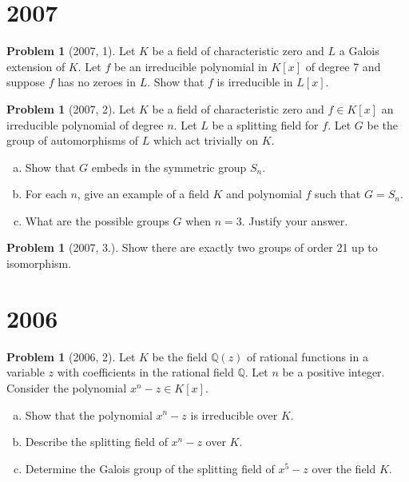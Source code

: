 \documentclass{article}
\newcommand{\<}{\langle} %
\renewcommand{\>}{\rangle} %
\theoremstyle{plain}
\theoremstyle{remark}
\theoremstyle{definition}
\newtheorem{examproblem}[equation]{Problem}
\begin{document}
\newpage

\section{2007}

\begin{examproblem}[2007, 1]
	Let $K$ be a field of characteristic zero and $L$ a Galois extension
	of $K$. Let $f$ be an irreducible polynomial in $K[x]$ of degree 7 and
	suppose $f$ has no zeroes in $L$. Show that $f$ is irreducible
	in $L[x]$.
\end{examproblem}

\begin{examproblem}[2007, 2]
	Let $K$ be a field of characteristic zero and $f\in K[x]$ an
	irreducible polynomial of degree $n$. Let $L$ be a splitting field for
	$f$. Let $G$ be the group of automorphisms of $L$ which act trivially
	on $K$.
	\begin{enumerate}[(a)]
		\item Show that $G$ embeds in the symmetric group $S_n$.
		\item For each $n$, give an example of a field $K$ and polynomial
			$f$ such that $G=S_n$.
		\item What are the possible groups $G$ when $n=3$. Justify
			your answer.
	\end{enumerate}
\end{examproblem}

\begin{examproblem}[2007, 3.]
	Show there are exactly two groups of order 21 up to isomorphism.
\end{examproblem}

\newpage

\section{2006}

\begin{examproblem}[2006, 2]
	Let $K$ be the field $\mathbb Q(z)$ of rational functions in a variable $z$
	with coefficients in the rational field $\mathbb Q$.
	Let $n$ be a positive integer. Consider the polynomial $x^n-z\in K[x]$.
	\begin{enumerate}[(a)]
		\item Show that the polynomial $x^n-z$ is irreducible over $K$.
		\item Describe the splitting field of $x^n-z$ over $K$.
		\item Determine the Galois group of the splitting field
			of $x^5-z$ over the field $K$.
	\end{enumerate}
\end{examproblem}
\end{document}
